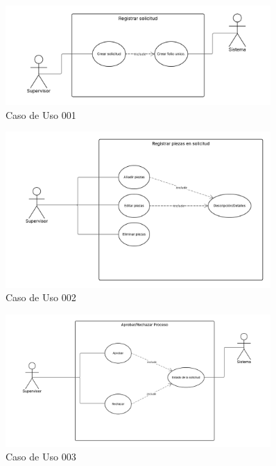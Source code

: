 \documentclass[12pt,letterpaper,spanish]{report}
\begin{document}
\begin{figure}[htp]
  \centering
  \includegraphics[width=0.9\textwidth]{DIACU01 (1).png}
  \caption{Caso de Uso 001}\label{d01}
\end{figure}

\begin{figure}[htp]
  \centering
  \includegraphics[width=0.9\textwidth]{DIACU02.png}
  \caption{Caso de Uso 002}\label{d02}
\end{figure}

\begin{figure}[htp]
  \centering
  \includegraphics[width=0.9\textwidth]{DIACU03.png}
  \caption{Caso de Uso 003}\label{d03}
\end{figure}
\end{document}
